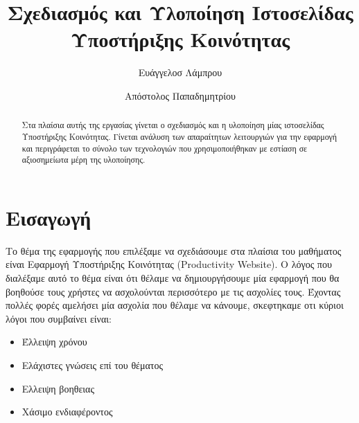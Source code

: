\documentclass[acmtog, nonacm, language=english, language=greek]{acmart}
\newcommand{\en}[1]{\textlatin{#1}}
\begin{document}
\title{Σχεδιασμός και Υλοποίηση Ιστοσελίδας Υποστήριξης Κοινότητας}

\author{Ευάγγελοσ Λάμπρου}
\orcid{}

\author{Απόστολος Παπαδημητρίου}

\begin{abstract}
    Στα πλαίσια αυτής της εργασίας γίνεται ο σχεδιασμός και η υλοποίηση μίας 
    ιστοσελίδας Υποστήριξης Κοινότητας. Γίνεται ανάλυση των απαραίτητων 
    λειτουργιών για την εφαρμογή και περιγράφεται το σύνολο των τεχνολογιών 
    που χρησιμοποιήθηκαν με εστίαση σε αξιοσημείωτα μέρη της υλοποίησης.
\end{abstract}

\maketitle

\section{Εισαγωγή}

Το θέμα της εφαρμογής που επιλέξαμε να σχεδιάσουμε στα πλαίσια του μαθήματος είναι Εφαρμογή Υποστήριξης Κοινότητας (\en{Productivity Website}). Ο λόγος που διαλέξαμε αυτό το θέμα είναι ότι θέλαμε να δημιουργήσουμε μία εφαρμογή που θα βοηθούσε τους χρήστες να ασχολούνται περισσότερο με τις ασχολίες τους.
Έχοντας πολλές φορές αμελήσει μία ασχολία που θέλαμε να κάνουμε, σκεφτηκαμε οτι κύριοι λόγοι που συμβαίνει είναι:
\begin{itemize}
    \item Έλλειψη χρόνου
    \item Ελάχιστες γνώσεις επί του θέματος
    \item Ελλειψη βοηθειας
    \item Χάσιμο ενδιαφέροντος
\end{itemize}
\end{document}
